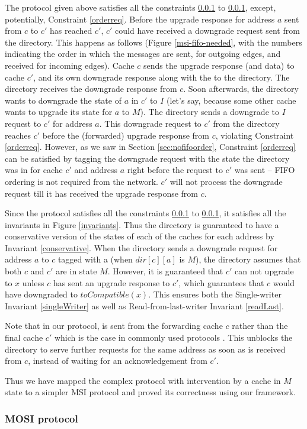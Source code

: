 The protocol given above satisfies all the constraints \ref{} to \ref{}, except,
potentially, Constraint \ref{orderreq}. Before the upgrade response for address
$a$ sent from $c$ to $c'$ has reached $c'$, $c'$ could have received a downgrade
request sent from the directory. This happens as follows (Figure
\ref{msi-fifo-needed}, with the numbers indicating the order in which the
messages are sent, for outgoing edges, and received for incoming edges). Cache
$c$ sends the upgrade response (and data) to cache $c'$, and its own downgrade
response along with the \FwdAck{} to the directory. The directory receives the
downgrade response from $c$. Soon afterwards, the directory wants to downgrade
the state of $a$ in $c'$ to $I$ (let's say, because some other cache wants to
upgrade its state for $a$ to $M$).  The directory sends a downgrade to $I$
request to $c'$ for address $a$. This downgrade request to $c'$ from the directory
reaches $c'$ before the (forwarded) upgrade response from $c$, violating
Constraint \ref{orderreq}. However, as we saw in Section \ref{sec:nofifoorder},
Constraint \ref{orderreq} can be satisfied by tagging the downgrade request with
the state the directory was in for cache $c'$ and address $a$ right before the
request to $c'$ was sent -- FIFO ordering is not required from the network. $c'$
will not process the downgrade request till it has received the upgrade response
from $c$.

Since the protocol satisfies all the constraints \ref{} to \ref{}, it satisfies
all the invariants in Figure \ref{invariants}. Thus the directory is guaranteed
to have a conservative version of the states of each of the caches for each
address by Invariant \ref{conservative}. When the directory sends a downgrade
request for address $a$ to $c$ tagged with a  (when $dir[c][a]$ is
$M$), the directory assumes that both $c$ and $c'$ are in state $M$. However, it
is guaranteed that $c'$ can not upgrade to $x$ unless $c$ has sent an upgrade
response to $c'$, which guarantees that $c$ would have downgraded to
$toCompatible(x)$. This ensures both the Single-writer Invariant
\ref{singleWriter} as well as Read-from-last-writer Invariant \ref{readLast}.

Note that in our protocol, \FwdAck is sent from the forwarding cache $c$ rather
than the final cache $c'$ which is the case in commonly used protocols
\cite{hammer, gems}. This unblocks the directory to serve further requests for
the same address as soon as \FwdAck is received from $c$, instead of waiting for
an acknowledgement from $c'$.

Thus we have mapped the complex protocol with intervention by a cache in $M$
state to a simpler MSI protocol and proved its correctness using our framework.

\subsubsection{MOSI protocol}
